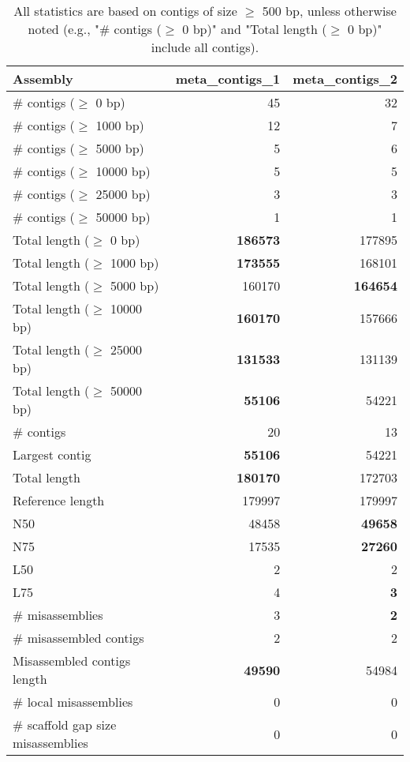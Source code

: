 \documentclass[12pt,a4paper]{article}
\begin{document}
\begin{table}[ht]
\begin{center}
\caption{All statistics are based on contigs of size $\geq$ 500 bp, unless otherwise noted (e.g., "\# contigs ($\geq$ 0 bp)" and "Total length ($\geq$ 0 bp)" include all contigs).}
\begin{tabular}{|l*{2}{|r}|}
\hline
Assembly & meta\_contigs\_1 & meta\_contigs\_2 \\ \hline
\# contigs ($\geq$ 0 bp) & 45 & 32 \\ \hline
\# contigs ($\geq$ 1000 bp) & 12 & 7 \\ \hline
\# contigs ($\geq$ 5000 bp) & 5 & 6 \\ \hline
\# contigs ($\geq$ 10000 bp) & 5 & 5 \\ \hline
\# contigs ($\geq$ 25000 bp) & 3 & 3 \\ \hline
\# contigs ($\geq$ 50000 bp) & 1 & 1 \\ \hline
Total length ($\geq$ 0 bp) & {\bf 186573} & 177895 \\ \hline
Total length ($\geq$ 1000 bp) & {\bf 173555} & 168101 \\ \hline
Total length ($\geq$ 5000 bp) & 160170 & {\bf 164654} \\ \hline
Total length ($\geq$ 10000 bp) & {\bf 160170} & 157666 \\ \hline
Total length ($\geq$ 25000 bp) & {\bf 131533} & 131139 \\ \hline
Total length ($\geq$ 50000 bp) & {\bf 55106} & 54221 \\ \hline
\# contigs & 20 & 13 \\ \hline
Largest contig & {\bf 55106} & 54221 \\ \hline
Total length & {\bf 180170} & 172703 \\ \hline
Reference length & 179997 & 179997 \\ \hline
N50 & 48458 & {\bf 49658} \\ \hline
N75 & 17535 & {\bf 27260} \\ \hline
L50 & 2 & 2 \\ \hline
L75 & 4 & {\bf 3} \\ \hline
\# misassemblies & 3 & {\bf 2} \\ \hline
\# misassembled contigs & 2 & 2 \\ \hline
Misassembled contigs length & {\bf 49590} & 54984 \\ \hline
\# local misassemblies & 0 & 0 \\ \hline
\# scaffold gap size misassemblies & 0 & 0 \\ \hline

\end{tabular}
\end{center}
\end{table}
\end{document}

